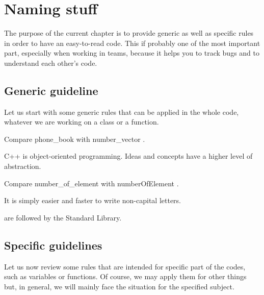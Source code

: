 \chapter{Naming stuff}

The purpose of the current chapter is to provide generic as well as specific rules in order to have an easy-to-read code.
This if probably one of the most important part, especially when working in teams, because it helps you to track bugs and to understand each other's code.



\section{Generic guideline}

Let us start with some generic rules that can be applied in the whole code, whatever we are working on a class or a function.


\begin{guiderule}
	Compare phone\_book with number\_vector \cite{Stroustrup_2013__Cpp_Prog_Lang,Martin_2009__Coder_propr}.
	
	C++ is object-oriented programming.
	Ideas and concepts have a higher level of abstraction.
\end{guiderule}


\begin{guiderule}
	\label{RUL::Name:underscore}
	Compare number\_of\_element with numberOfElement \cite{Stroustrup_2013__Cpp_Prog_Lang}.
\end{guiderule}


\begin{guiderule}
	\label{RUL::Name:avoid_capitals}
	It is simply easier and faster to write non-capital letters.
\end{guiderule}


 are followed by the Standard Library.



\section{Specific guidelines}

Let us now review some rules that are intended for specific part of the codes, such as variables or functions.
Of course, we may apply them for other things but, in general, we will mainly face the situation for the specified subject.


